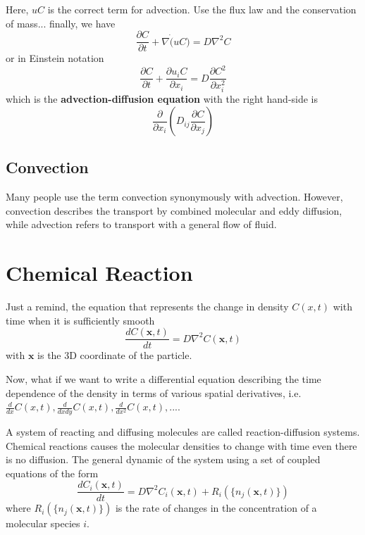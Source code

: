 Here, $uC$ is the correct term for advection.  Use the flux law and
the conservation of mass... finally, we have
\begin{equation}
  \label{eq:198}
  \frac{\partial C}{\partial t} + \nabla \dot (uC) = D\nabla^2 C
\end{equation}
 or in Einstein notation
 \begin{equation}
   \label{eq:199}
   \frac{\partial C}{\partial t} + \frac{\partial u_iC}{\partial x_i}
   = D\frac{\partial C^2}{\partial x_i^2}
 \end{equation}
which is the {\bf advection-diffusion equation} with the right
hand-side is
\begin{equation}
  \label{eq:200}
  \frac{\partial}{\partial x_i} \left( D_{ij} \frac{\partial
      C}{\partial x_j} \right)
\end{equation}

\subsection{Convection}
\label{sec:convection}

Many people use the term convection synonymously with
advection. However, convection describes the transport by combined
molecular and eddy diffusion, while advection refers to transport with
a general flow of fluid.


\section{Chemical Reaction}
\label{sec:chemical-reaction}

Just a remind, the equation that represents the change in density
$C(x,t)$ with time when it is sufficiently smooth
\begin{equation}
  \label{eq:217}
  \frac{dC(\mathbf{x},t)}{dt} = D\nabla^2C(\mathbf{x},t)
\end{equation}
with $\mathbf{x}$ is the 3D coordinate of the particle. 

Now, what if we want to write a differential equation describing the
time dependence of the density in terms of various spatial
derivatives, i.e. $\frac{d}{dx}C(x,t), \frac{d}{dxdy}C(x,t),
\frac{d}{dx^2}C(x,t), ...$.


A system of reacting and diffusing molecules are called
reaction-diffusion systems. Chemical reactions causes the molecular
densities to change with time even there is no diffusion. The general
dynamic of the system using a set of coupled equations of the form
\begin{equation}
  \label{eq:218}
  \frac{dC_i(\mathbf{x},t)}{dt} = D\nabla^2C_i(\mathbf{x},t)+R_i(\{n_j(\mathbf{x},t)\})
\end{equation}
where $R_i(\{n_j(\mathbf{x},t)\})$ is the rate of changes in the
concentration of a molecular species $i$.


